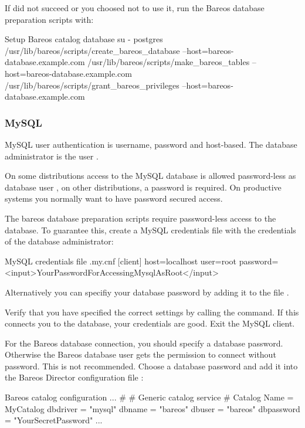 If  did not succeed or you choosed not to use it, run the Bareos database preparation scripts with:
\begin{commands}{Setup Bareos catalog database}
su - postgres
/usr/lib/bareos/scripts/create_bareos_database --host=bareos-database.example.com
/usr/lib/bareos/scripts/make_bareos_tables --host=bareos-database.example.com
/usr/lib/bareos/scripts/grant_bareos_privileges --host=bareos-database.example.com
\end{commands}

\subsubsection{MySQL}
    \label{catalog-maintenance-mysql}

MySQL user authentication is username, password and host-based.
The database administrator is the user .

On some distributions access to the MySQL database is allowed password-less as database user ,
on other distributions, a password is required.
On productive systems you normally want to have password secured access.

The bareos database preparation scripts require password-less access to the database.
To guarantee this, create a MySQL credentials file  with the credentials of the database administrator:
\begin{config}{MySQL credentials file .my.cnf}
[client]
host=localhost
user=root
password=<input>YourPasswordForAccessingMysqlAsRoot</input>
\end{config}
Alternatively you can specifiy your database password by adding it to the file .

Verify that you have specified the correct settings by calling the  command.
If this connects you to the database, your credentials are good.
Exit the MySQL client.

For the Bareos database connection, you should specify a database password. 
Otherwise the Bareos database user gets the permission to connect without password.
This is not recommended.
Choose a database password and add it into the Bareos Director configuration file \configFileDirUnix:
\begin{bconfig}{Bareos catalog configuration}
...
#
# Generic catalog service
#
Catalog {
  Name = MyCatalog
  dbdriver = "mysql"
  dbname = "bareos"
  dbuser = "bareos"
  dbpassword = "YourSecretPassword"
}
...
\end{bconfig}


